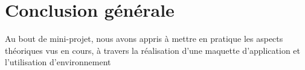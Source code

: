 \section{Conclusion générale}
Au bout de mini-projet, nous avons appris à mettre en pratique les aspects théoriques vus en cours, à travers la réalisation d'une maquette d'application et l'utilisation d'environnement 